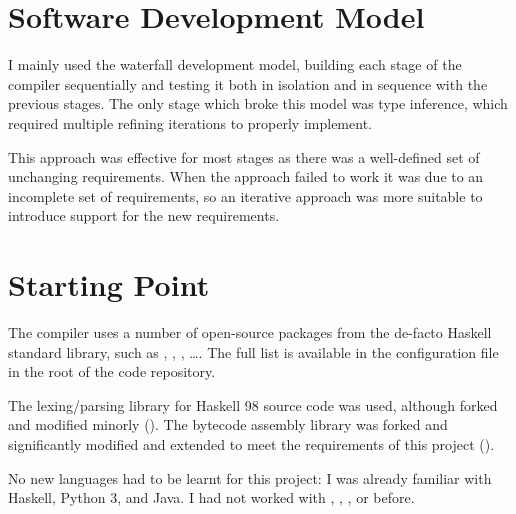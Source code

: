 \documentclass[dissertation.tex]{subfiles}
\begin{document}
\section{Software Development Model}\label{sec:software-development-model}
{
    I mainly used the waterfall development model, building each stage of the compiler sequentially and testing it both in isolation and in sequence with the previous stages. The only stage which broke this model was type inference, which required multiple refining iterations to properly implement.

    This approach was effective for most stages as there was a well-defined set of unchanging requirements. When the approach failed to work it was due to an incomplete set of requirements, so an iterative approach was more suitable to introduce support for the new requirements.
}
\section{Starting Point}\label{sec:starting-point}
{
    The compiler uses a number of open-source packages from the de-facto Haskell standard library, such as , , , \dots. The full list is available in the  configuration file in the root of the code repository.

    The  lexing/parsing library for Haskell 98 source code was used, although forked and modified minorly (). The bytecode assembly library  was forked and significantly modified and extended to meet the requirements of this project ().

    No new languages had to be learnt for this project: I was already familiar with Haskell, Python 3, and Java. I had not worked with , , , or  before. 
}
\end{document}
